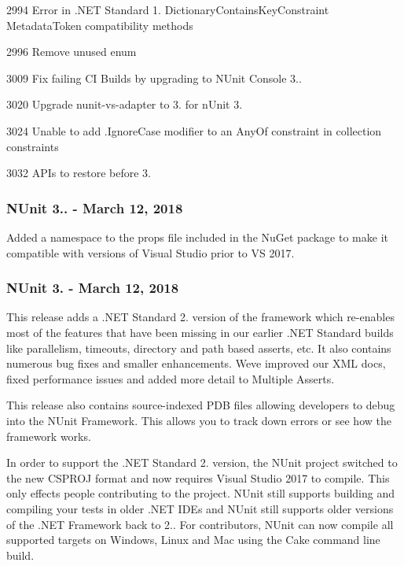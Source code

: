 \begin{DoxyItemize}
\item 2994 Error in .N\+ET Standard 1. Dictionary\+Contains\+Key\+Constraint Metadata\+Token compatibility methods
\item 2996 Remove unused enum
\item 3009 Fix failing CI Builds by upgrading to N\+Unit Console 3..
\item 3020 Upgrade nunit-\/vs-\/adapter to 3. for n\+Unit 3.
\item 3024 Unable to add {\ttfamily .Ignore\+Case} modifier to an {\ttfamily Any\+Of} constraint in collection constraints
\item 3032 A\+P\+Is to restore before 3.
\end{DoxyItemize}

\subsubsection*{N\+Unit 3.. -\/ March 12, 2018}

Added a namespace to the props file included in the Nu\+Get package to make it compatible with versions of Visual Studio prior to VS 2017.

\subsubsection*{N\+Unit 3. -\/ March 12, 2018}

This release adds a .N\+ET Standard 2. version of the framework which re-\/enables most of the features that have been missing in our earlier .N\+ET Standard builds like parallelism, timeouts, directory and path based asserts, etc. It also contains numerous bug fixes and smaller enhancements. We\textquotesingle{}ve improved our X\+ML docs, fixed performance issues and added more detail to Multiple Asserts.

This release also contains source-\/indexed P\+DB files allowing developers to debug into the N\+Unit Framework. This allows you to track down errors or see how the framework works.

In order to support the .N\+ET Standard 2. version, the N\+Unit project switched to the new C\+S\+P\+R\+OJ format and now requires Visual Studio 2017 to compile. This only effects people contributing to the project. N\+Unit still supports building and compiling your tests in older .N\+ET I\+D\+Es and N\+Unit still supports older versions of the .N\+ET Framework back to 2.. For contributors, N\+Unit can now compile all supported targets on Windows, Linux and Mac using the Cake command line build.

